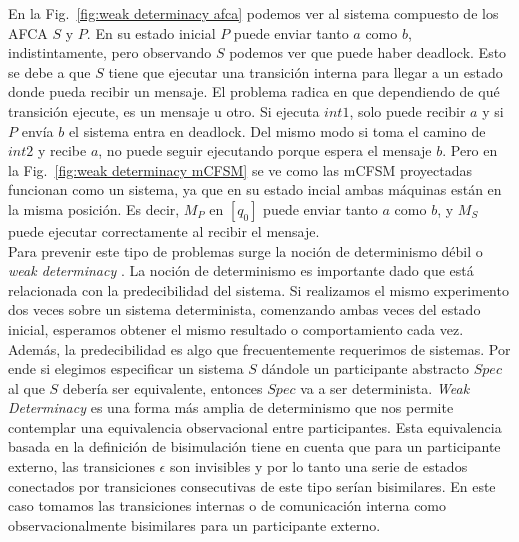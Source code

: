 En la Fig.~\ref{fig:weak determinacy afca} podemos ver al sistema compuesto de los AFCA $S$ y $P$. En su estado inicial $P$ puede enviar tanto $a$ como $b$, indistintamente, pero observando $S$ podemos ver que puede haber deadlock. Esto se debe a que $S$ tiene que ejecutar una transición interna para llegar a un estado donde pueda recibir un mensaje. El problema radica en que dependiendo de qué transición ejecute, es un mensaje u otro. Si ejecuta $int1$, solo puede recibir $a$ y si $P$ envía $b$ el sistema entra en deadlock. Del mismo modo si toma el camino de $int2$ y recibe $a$, no puede seguir ejecutando porque espera el mensaje $b$. Pero en la Fig.~\ref{fig:weak determinacy mCFSM} se ve como las mCFSM proyectadas funcionan como un sistema, ya que en su estado incial ambas máquinas están en la misma posición. Es decir, $M_P$ en $[q_0]$ puede enviar tanto $a$ como $b$, y $M_S$ puede ejecutar correctamente al recibir el mensaje.\\

Para prevenir este tipo de problemas surge la noción de determinismo débil o \emph{weak determinacy} \cite[Chap.~11, Def.~3]{milner89}. La noción de determinismo es importante dado que está relacionada con la predecibilidad del sistema. Si realizamos el mismo experimento dos veces sobre un sistema determinista, comenzando ambas veces del estado inicial, esperamos obtener el mismo resultado o comportamiento cada vez. Además, la predecibilidad es algo que frecuentemente requerimos de sistemas. Por ende si elegimos especificar un sistema $S$ dándole un participante abstracto $Spec$ al que $S$ debería ser equivalente, entonces $Spec$ va a ser determinista. \emph{Weak Determinacy} es una forma más amplia de determinismo que nos permite contemplar una equivalencia observacional entre participantes. Esta equivalencia basada en la definición de bisimulación tiene en cuenta que para un participante externo, las transiciones $\epsilon$ son invisibles y por lo tanto una serie de estados conectados por transiciones consecutivas de este tipo serían bisimilares. En este caso tomamos las transiciones internas o de comunicación interna como observacionalmente bisimilares para un participante externo.  


